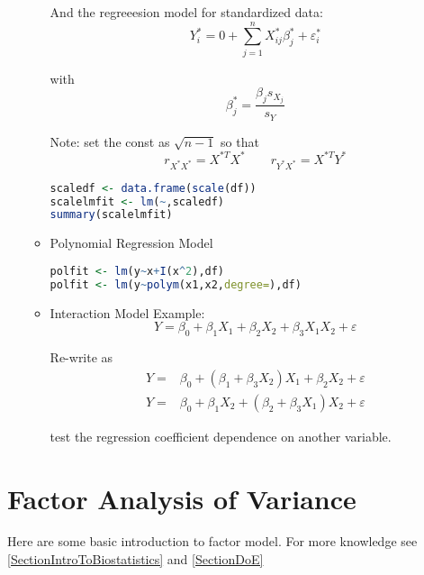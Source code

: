 \begin{itemize}[topsep=2pt,itemsep=0pt]
\begin{itemize}[topsep=2pt,itemsep=0pt]
And the regreeesion model for standardized data:
\begin{equation}
    Y^*_i=0+\sum_{j=1}^nX_{ij}^*\beta _j^*+\varepsilon _i^* 
\end{equation}

with
\begin{equation}
    \beta _j^*=\dfrac{\beta _js_{X_j}}{s_Y} 
\end{equation}

Note: set the const as $ \sqrt{n-1} $ so that 
\begin{equation}
    r_{X^*X^*}=X^{*T}X^* \qquad r_{Y^*X^*}=X^{*T}Y^*
\end{equation}
\begin{rcode}
\begin{lstlisting}[language=R]
scaledf <- data.frame(scale(df))
scalelmfit <- lm(~,scaledf)
summary(scalelmfit)
\end{lstlisting}
\end{rcode}
    \item Polynomial Regression Model

\begin{rcode}
\begin{lstlisting}[language=R]
polfit <- lm(y~x+I(x^2),df)
polfit <- lm(y~polym(x1,x2,degree=),df)
\end{lstlisting}
\end{rcode}
    
    \item Interaction Model
    Example: 
    \begin{equation}
        Y=\beta _0+\beta _1X_1+\beta _2X_2+\beta _{3}X_1X_2+\varepsilon  
    \end{equation}
    
    Re-write as
    \begin{align*}
        Y=&\beta _0+(\beta _1+\beta _3X_2)X_1+\beta _2X_2+\varepsilon \\
        Y=&\beta _0+\beta _1X_2+(\beta _2+\beta _3X_1)X_2+\varepsilon 
    \end{align*}

    test the regression coefficient dependence on another variable.

\end{itemize}
   
      
\end{itemize}





\section{Factor Analysis of Variance}\label{SubSectionLRAFactorANOVA}
Here are some basic introduction to factor model. For more knowledge see \autoref{SectionIntroToBiostatistics} and \autoref{SectionDoE}

